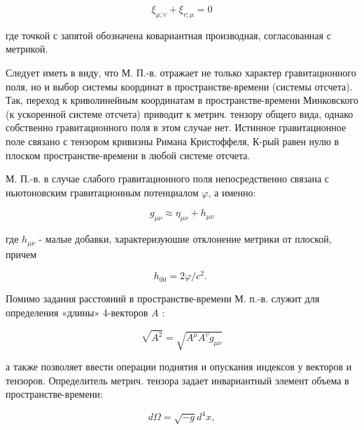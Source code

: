 \documentclass[10pt]{article}
\begin{document}
\[

\xi_{\mu ; v}+\xi_{v ; \mu}=0

\]



где точкой с запятой обозначена ковариантная производная, согласованная с метрикой.



Следует иметь в виду, что М. П.-в. отражает не только характер гравитационного поля, но и выбор системы координат в пространстве-времени (системы отсчета). Так, переход к криволинейным координатам в пространстве-времени Минковского (к ускоренной системе отсчета) приводит к метрич. тензору общего вида, однако собственно гравитационного поля в этом случае нет. Истинное гравитационное поле связано с тензором кривизны Римана Кристоффеля, К-рый равен нулю в плоском пространстве-времени в любой системе отсчета.



М. П.-в. в случае слабого гравитационного поля непосредственно связана с ньютоновским гравитационным потенциалом $\varphi$, а именно:



\[

g_{\mu \nu} \approx \eta_{\mu \nu}+h_{\mu \nu}

\]



где $h_{\mu \nu}$ - малые добавки, характеризуюшие отклонение метрики от плоской, причем



\[

h_{00}=2 \varphi / c^{2} \text {. }

\]



Помимо задания расстояний в пространстве-времени М. п.-в. служит для определения «длины» 4-векторов $A$ :



\[

\sqrt{A^{2}}=\sqrt{A^{\mu} A^{v} g_{\mu \nu}}

\]



а также позволяет ввести операции поднятия и опускания индексов у векторов и тензоров. Определитель метрич. тензора задает инвариантный элемент объема в пространстве-времени:



\[

d \Omega=\sqrt{-g} d^{4} x,

\]
\end{document}
